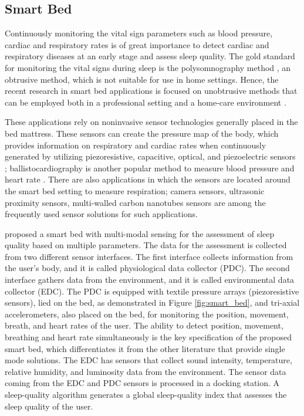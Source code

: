 \subsection{Smart Bed}

Continuously monitoring the vital sign parameters such as blood pressure, cardiac and respiratory rates is of great importance to detect cardiac and respiratory diseases at an early stage and assess sleep quality. The gold standard for monitoring the vital signs during sleep is the polysomnography method \parencite{jafari_polysomnography_2010}, an obtrusive method, which is not suitable for use in home settings. Hence, the recent research in smart bed applications is focused on unobtrusive methods that can be employed both in a professional setting and a home-care environment \parencite{laurino_smart_2020,su_monitoring_2019,waltisberg_detecting_2017,wang_noninvasive_2020,yu_multi-modal_2019}. 

These applications rely on noninvasive sensor technologies generally placed in the bed mattress. These sensors can create the pressure map of the body, which provides information on respiratory and cardiac rates when continuously generated by utilizing piezoresistive, capacitive, optical, and piezoelectric sensors \parencite{laurino_smart_2020,waltisberg_detecting_2017,wang_noninvasive_2020}; ballistocardiography is another popular method to measure blood pressure and heart rate \parencite{su_monitoring_2019,yu_multi-modal_2019}. There are also applications in which the sensors are located around the smart bed setting to measure respiration; camera sensors, ultrasonic proximity sensors, multi-walled carbon nanotubes sensors are among the frequently used sensor solutions for such applications.

\textcite{laurino_smart_2020} proposed a smart bed with multi-modal sensing for the assessment of sleep quality based on multiple parameters. The data for the assessment is collected from two different sensor interfaces. The first interface collects information from the user's body, and it is called physiological data collector (PDC). The second interface gathers data from the environment, and it is called environmental data collector (EDC). The PDC is equipped with textile pressure arrays (piezoresistive sensors), lied on the bed, as demonstrated in Figure \ref{fig:smart_bed},  and tri-axial accelerometers, also placed on the bed, for monitoring the position, movement, breath, and heart rates of the user. The ability to detect position, movement, breathing and heart rate simultaneously is the key specification of the proposed smart bed, which differentiates it from the other literature that provide single mode solutions. The EDC has sensors that collect sound intensity, temperature, relative humidity, and luminosity data from the environment. The sensor data coming from the EDC and PDC sensors is processed in a docking station. A sleep-quality algorithm generates a global sleep-quality index that  assesses the sleep quality of the user. 

